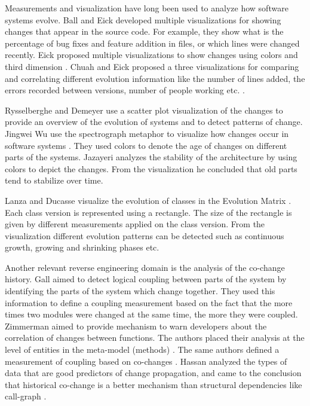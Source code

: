 Measurements and visualization have long been used to analyze how software systems evolve.
%
Ball and Eick \cite{Ball96a} developed multiple visualizations for showing changes that appear in the source code. For example, they show what is the percentage of bug fixes and feature addition in files, or which lines were changed recently.
%
Eick \etal proposed multiple visualizations to show changes using colors and third dimension \cite{Eick02a}.
%
Chuah and Eick proposed a three visualizations for comparing and correlating different evolution information like the number of lines added, the errors recorded between versions, number of people working etc. \cite{Chua98a}.

Rysselberghe and Demeyer use a scatter plot visualization of the changes  to provide an overview of the evolution of systems and to detect patterns of change\cite{Ryss04a}.
%
Jingwei Wu \etal use the spectrograph metaphor to visualize how changes occur in software systems \cite{Wu04a}. They used colors to denote the age of changes on different parts of the systems.
%
Jazayeri analyzes the stability of the architecture \cite{Jaza02a} by using colors to depict the changes. From the visualization he concluded that old parts tend to stabilize over time.

Lanza and Ducasse visualize the evolution of classes in the Evolution Matrix \cite{Lanz02a}. Each class version is represented using a rectangle. The size of the rectangle is given by different measurements applied on the class version. From the visualization different evolution patterns can be detected such as continuous growth, growing and shrinking phases etc.

Another relevant reverse engineering domain is the analysis of the co-change history.
%
Gall \etal aimed to detect logical coupling between parts of the system \cite{Gall98a} by identifying the parts of the system which change together. They used this information to define a coupling measurement based on the fact that the more times two modules were changed at the same time, the more they were coupled.
%
Zimmerman \etal aimed to provide mechanism to warn developers about the correlation of changes between functions. The authors placed their analysis at the level of entities in the meta-model (\eg methods) \cite{Zimm04a}. The same authors defined a measurement of coupling based on co-changes \cite{Zimm03a}.
%
Hassan \etal analyzed the  types of data that are good predictors of change propagation, and came to the conclusion that historical co-change is a better mechanism than structural dependencies like call-graph \cite{Hass04a}.

